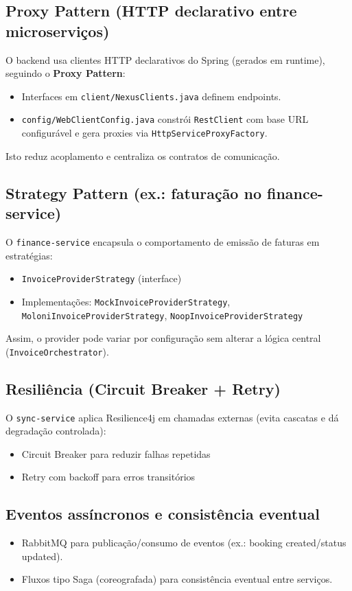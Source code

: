 \documentclass[11pt,a4paper]{article}
\begin{document}
\subsection{Proxy Pattern (HTTP declarativo entre microserviços)}
O backend usa clientes HTTP declarativos do Spring (gerados em runtime), seguindo o \textbf{Proxy Pattern}:
\begin{itemize}[nosep]
  \item Interfaces em \texttt{client/NexusClients.java} definem endpoints.
  \item \texttt{config/WebClientConfig.java} constrói \texttt{RestClient} com base URL configurável e gera proxies via \texttt{HttpServiceProxyFactory}.
\end{itemize}
Isto reduz acoplamento e centraliza os contratos de comunicação.

\subsection{Strategy Pattern (ex.: faturação no finance-service)}
O \texttt{finance-service} encapsula o comportamento de emissão de faturas em estratégias:
\begin{itemize}[nosep]
  \item \texttt{InvoiceProviderStrategy} (interface)
  \item Implementações: \texttt{MockInvoiceProviderStrategy}, \texttt{MoloniInvoiceProviderStrategy}, \texttt{NoopInvoiceProviderStrategy}
\end{itemize}
Assim, o provider pode variar por configuração sem alterar a lógica central (\texttt{InvoiceOrchestrator}).

\subsection{Resiliência (Circuit Breaker + Retry)}
O \texttt{sync-service} aplica Resilience4j em chamadas externas (evita cascatas e dá degradação controlada):
\begin{itemize}[nosep]
  \item Circuit Breaker para reduzir falhas repetidas
  \item Retry com backoff para erros transitórios
\end{itemize}

\subsection{Eventos assíncronos e consistência eventual}
\begin{itemize}[nosep]
  \item RabbitMQ para publicação/consumo de eventos (ex.: booking created/status updated).
  \item Fluxos tipo Saga (coreografada) para consistência eventual entre serviços.
\end{itemize}
\end{document}
